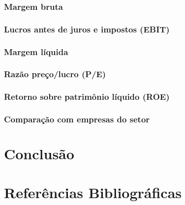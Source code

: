 \documentclass[grad,numbers]{coppe}
\begin{document}
  \hypertarget{margem-bruta}{%
  \subsection{Margem bruta}\label{margem-bruta}}
  
  \hypertarget{lucros-antes-de-juros-e-impostos-ebit}{%
  \subsection{Lucros antes de juros e impostos (EBIT)}\label{lucros-antes-de-juros-e-impostos-ebit}}
  
  \hypertarget{margem-luxedquida}{%
  \subsection{Margem líquida}\label{margem-luxedquida}}
  
  \hypertarget{razuxe3o-preuxe7olucro-pe}{%
  \subsection{Razão preço/lucro (P/E)}\label{razuxe3o-preuxe7olucro-pe}}
  
  \hypertarget{retorno-sobre-patrimuxf4nio-luxedquido-roe}{%
  \subsection{Retorno sobre patrimônio líquido (ROE)}\label{retorno-sobre-patrimuxf4nio-luxedquido-roe}}
  
  \hypertarget{comparauxe7uxe3o-com-empresas-do-setor}{%
  \subsection{Comparação com empresas do setor}\label{comparauxe7uxe3o-com-empresas-do-setor}}
  
  \hypertarget{conclusuxe3o}{%
  \chapter{Conclusão}\label{conclusuxe3o}}
  
  \backmatter
  
  \hypertarget{referuxeancias-bibliogruxe1ficas}{%
  \chapter*{Referências Bibliográficas}\label{referuxeancias-bibliogruxe1ficas}}
  
\end{document}

